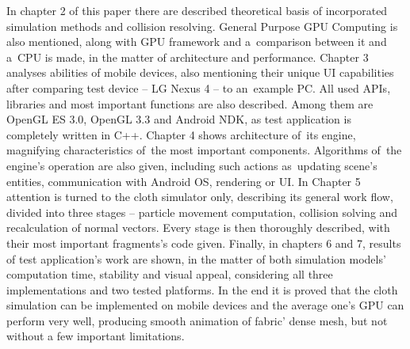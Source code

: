 In chapter 2 of this paper there are described theoretical basis of incorporated simulation methods and collision resolving. General Purpose GPU Computing is also mentioned, along with GPU framework and a~comparison between it and a~CPU is made, in the matter of architecture and performance. Chapter 3 analyses abilities of mobile devices, also mentioning their unique UI capabilities after comparing test device -- LG Nexus 4 -- to an~example PC. All used APIs, libraries and most important functions are also described. Among them are OpenGL ES 3.0, OpenGL 3.3 and Android NDK, as test application is completely written in C++. Chapter 4 shows architecture of~its engine, magnifying characteristics of~the most important components. Algorithms of~the engine's operation are also given, including such actions as~updating scene's entities, communication with Android OS, rendering or UI. In Chapter 5 attention is turned to the cloth simulator only, describing its general work flow, divided into three stages -- particle movement computation, collision solving and recalculation of normal vectors. Every stage is then thoroughly described, with their most important fragments's code given. Finally, in chapters 6 and 7, results of test application's work are shown, in the matter of both simulation models' computation time, stability and visual appeal, considering all three implementations and two tested platforms. In the end it is proved that the cloth simulation can be implemented on mobile devices and the average one's GPU can perform very well, producing smooth animation of fabric' dense mesh, but not without a few important limitations.